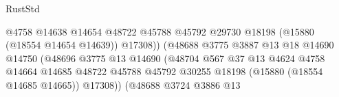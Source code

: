 \begin{lexlean}{RustStd}
\begin{coremodule}
                                                          @4758
                                                          @14638
                                                          @14654
                                                          @48722
                                                          @45788
                                                          @45792
                                                          @29730
                                                          @18198
                                                          (@15880 (@18554 @14654 @14639))
                                                          @17308))
                                                      (@48688
                                                        @3775
                                                        @3887
                                                        @13
                                                        @18
                                                        @14690
                                                        @14750
                                                        (@48696
                                                          @3775
                                                          @13
                                                          @14690
                                                          (@48704
                                                            @567
                                                            @37
                                                            @13
                                                            @4624
                                                            @4758
                                                            @14664
                                                            @14685
                                                            @48722
                                                            @45788
                                                            @45792
                                                            @30255
                                                            @18198
                                                            (@15880 (@18554 @14685 @14665))
                                                            @17308))
                                                        (@48688
                                                          @3724
                                                          @3886
                                                          @13

\end{coremodule}
\end{lexlean}
